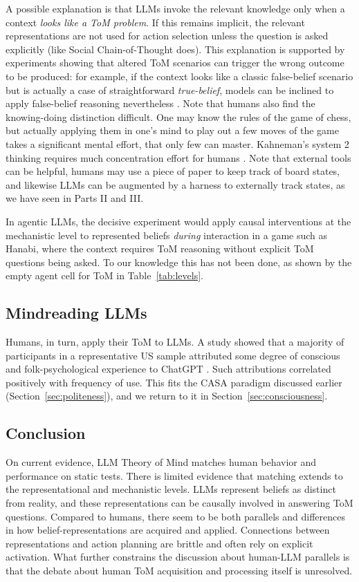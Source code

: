A possible explanation is that LLMs invoke the relevant knowledge only when a context \emph{looks like a ToM problem}. If this remains implicit, the relevant representations are not used for action selection unless the question is asked explicitly (like Social Chain-of-Thought does). This explanation is supported by experiments showing that altered ToM scenarios can trigger the wrong outcome to be produced: for example, if the context looks like a classic false-belief scenario but is actually a case of straightforward \emph{true-belief}, models can be inclined to apply false-belief reasoning nevertheless \citep{ullman2023large, kouwenhoven2026traces}. Note that humans also find the knowing-doing distinction difficult. One may know the rules of the game of chess, but actually applying them in one's mind to play out a few moves of the game takes a significant mental effort, that only few can master. Kahneman's system 2 thinking requires much concentration effort for humans \citep{kahneman2011thinking}. Note that external tools can be helpful, humans may use a piece of paper to keep track of board states, and likewise LLMs can be augmented by a harness to externally track states, as we have seen in Parts II and III.

In agentic LLMs, the decisive experiment would apply causal interventions at the mechanistic level to represented beliefs \emph{during} interaction in a game such as Hanabi, where the context requires ToM reasoning without explicit ToM questions being asked. To our knowledge this has not been done, as shown by the empty agent cell for ToM in Table~\ref{tab:levels}.

\subsection{Mindreading LLMs}
Humans, in turn, apply their ToM to LLMs. A study showed that a majority of participants in a representative US sample attributed some degree of conscious and folk-psychological experience to ChatGPT \citep{colombatto2024folk}. Such attributions correlated positively with frequency of use. This fits the CASA paradigm discussed earlier (Section~\ref{sec:politeness}), and we return to it in Section~\ref{sec:consciousness}.

\subsection{Conclusion}
On current evidence, LLM Theory of Mind matches human behavior and performance on static tests. There is limited evidence that matching extends to the representational and mechanistic levels.  LLMs represent beliefs as distinct from reality, and these representations can be causally involved in answering ToM questions. Compared to humans, there seem to be both parallels and differences in how belief-representations are acquired and applied. Connections between representations and action planning are brittle and often rely on explicit activation. What further constrains the discussion about human-LLM parallels is that the debate about human ToM acquisition and processing itself is unresolved.

